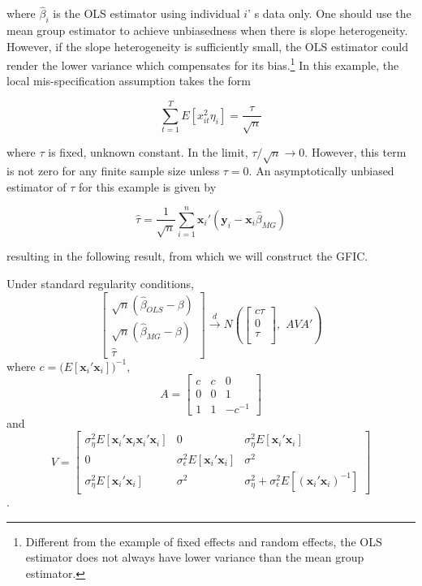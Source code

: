 where $\widehat{\beta}_i$ is the OLS estimator using individual $i$'
s data only. One should use the mean group estimator to achieve unbiasedness when there is slope heterogeneity. However, if the slope heterogeneity is sufficiently small, the OLS estimator could render the lower variance which compensates for its bias.\footnote{Different from the example of fixed effects and random effects, the OLS estimator does not always have lower variance than the mean group estimator.} In this example, the local mis-specification assumption takes the form  

\begin{equation}
\sum_{t=1}^T E[x_{it}^2 \eta_i] = \frac{\tau}{\sqrt{n}}
\end{equation}

where $\tau$ is fixed, unknown constant. In the limit, $\tau/\sqrt{n} \rightarrow 0$. However, this term is not zero for any finite sample size unless $\tau =0$. An asymptotically unbiased estimator of $\tau$ for this example is given by

\begin{equation}
\widehat{\tau} = \frac{1}{\sqrt{n}} \sum_{i=1}^n \mathbf{x}_i' (\mathbf{y}_i - \mathbf{x}_i \widehat{\beta}_{MG})
\end{equation}

resulting in the following result, from which we will construct the GFIC. 

\begin{thm}
\label{thm:OLSvsMG}
  Under standard regularity conditions,
\[
  \left[\begin{array}{c}
\sqrt{n} (\widehat{\beta}_{OLS} - \beta)\\
\sqrt{n} (\widehat{\beta}_{MG} - \beta)\\
\widehat{\tau}
\end{array}\right] \overset{d}{\rightarrow} N \left( 
\left[\begin{array}{c}
c\tau \\
0  \\
\tau\\
\end{array}\right],  
\,\,A V A' \right)
\]
where $c = \big(E[\mathbf{x}_i' \mathbf{x}_i] \big)^{-1}$, 
\[
A = \left[\begin{array}{ccc}
c  & c& 0\\
0& 0 & 1\\
1 & 1 & -c^{-1}
\end{array}\right] \]
and
\[
V = \left[\begin{array}{ccc}
\sigma_\eta^2 E[\mathbf{x}_i'\mathbf{x}_i\mathbf{x}_i' \mathbf{x}_i]  & 0  & \sigma_\eta^2 E[\mathbf{x}_i' \mathbf{x}_i] \\
0 & \sigma_\epsilon^2 E[\mathbf{x}_i'\mathbf{x}_i] & \sigma^2\\ 
\sigma_\eta^2 E[\mathbf{x}_i'\mathbf{x}_i] & \sigma^2 & \sigma_\eta^2 + \sigma_\epsilon^2 E[(\mathbf{x}_i'\mathbf{x}_i)^{-1} ]
\end{array}\right] \].\\
\end{thm}



